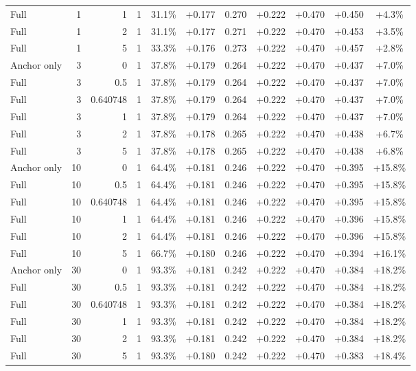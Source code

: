 \begin{table}[htbp]
\begin{tabular}{lrrrccccccc}
Full & 1 & 1 & 1 & 31.1\% & +0.177 & 0.270 & +0.222 & +0.470 & +0.450 & +4.3\% \\
Full & 1 & 2 & 1 & 31.1\% & +0.177 & 0.271 & +0.222 & +0.470 & +0.453 & +3.5\% \\
Full & 1 & 5 & 1 & 33.3\% & +0.176 & 0.273 & +0.222 & +0.470 & +0.457 & +2.8\% \\
Anchor only & 3 & 0 & 1 & 37.8\% & +0.179 & 0.264 & +0.222 & +0.470 & +0.437 & +7.0\% \\
Full & 3 & 0.5 & 1 & 37.8\% & +0.179 & 0.264 & +0.222 & +0.470 & +0.437 & +7.0\% \\
Full & 3 & 0.640748 & 1 & 37.8\% & +0.179 & 0.264 & +0.222 & +0.470 & +0.437 & +7.0\% \\
Full & 3 & 1 & 1 & 37.8\% & +0.179 & 0.264 & +0.222 & +0.470 & +0.437 & +7.0\% \\
Full & 3 & 2 & 1 & 37.8\% & +0.178 & 0.265 & +0.222 & +0.470 & +0.438 & +6.7\% \\
Full & 3 & 5 & 1 & 37.8\% & +0.178 & 0.265 & +0.222 & +0.470 & +0.438 & +6.8\% \\
Anchor only & 10 & 0 & 1 & 64.4\% & +0.181 & 0.246 & +0.222 & +0.470 & +0.395 & +15.8\% \\
Full & 10 & 0.5 & 1 & 64.4\% & +0.181 & 0.246 & +0.222 & +0.470 & +0.395 & +15.8\% \\
Full & 10 & 0.640748 & 1 & 64.4\% & +0.181 & 0.246 & +0.222 & +0.470 & +0.395 & +15.8\% \\
Full & 10 & 1 & 1 & 64.4\% & +0.181 & 0.246 & +0.222 & +0.470 & +0.396 & +15.8\% \\
Full & 10 & 2 & 1 & 64.4\% & +0.181 & 0.246 & +0.222 & +0.470 & +0.396 & +15.8\% \\
Full & 10 & 5 & 1 & 66.7\% & +0.180 & 0.246 & +0.222 & +0.470 & +0.394 & +16.1\% \\
Anchor only & 30 & 0 & 1 & 93.3\% & +0.181 & 0.242 & +0.222 & +0.470 & +0.384 & +18.2\% \\
Full & 30 & 0.5 & 1 & 93.3\% & +0.181 & 0.242 & +0.222 & +0.470 & +0.384 & +18.2\% \\
Full & 30 & 0.640748 & 1 & 93.3\% & +0.181 & 0.242 & +0.222 & +0.470 & +0.384 & +18.2\% \\
Full & 30 & 1 & 1 & 93.3\% & +0.181 & 0.242 & +0.222 & +0.470 & +0.384 & +18.2\% \\
Full & 30 & 2 & 1 & 93.3\% & +0.181 & 0.242 & +0.222 & +0.470 & +0.384 & +18.2\% \\
Full & 30 & 5 & 1 & 93.3\% & +0.180 & 0.242 & +0.222 & +0.470 & +0.383 & +18.4\% \\

\end{tabular}
\end{table}
